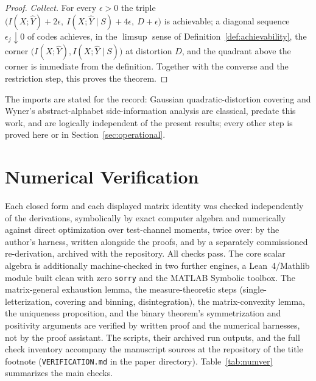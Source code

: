﻿\documentclass[11pt,onecolumn]{IEEEtran}
\newcommand{\hY}{\widehat{Y}}
\begin{document}
\begin{proof}
\emph{Collect.} For every $\epsilon>0$ the triple
$\bigl(I(X;\hY)+2\epsilon,\ I(X;\hY\mid S)+4\epsilon,\
D+\epsilon\bigr)$ is achievable; a diagonal sequence
$\epsilon_j\downarrow0$ of codes achieves, in the $\limsup$ sense of
Definition~\ref{def:achievability}, the corner
$\bigl(I(X;\hY),I(X;\hY\mid S)\bigr)$ at distortion $D$, and the
quadrant above the corner is immediate from the definition. Together
with the converse and the restriction step, this proves the theorem.
\end{proof}

The imports are stated for the record: Gaussian quadratic-distortion
covering \cite{berger1971} and Wyner's abstract-alphabet
side-information analysis \cite{wyner1978} are classical, predate this
work, and are logically independent of the present results; every other
step is proved here or in Section~\ref{sec:operational}.

\section{Numerical Verification}
\label{app:numver}

Each closed form and each displayed matrix identity was checked
independently of the derivations, symbolically by exact computer algebra
and numerically against direct optimization over test-channel moments,
twice over: by the author's harness, written alongside the proofs, and
by a separately commissioned re-derivation, archived with the
repository. All checks pass. The core scalar algebra is
additionally machine-checked in two further engines, a Lean~4/Mathlib
module built clean with zero \texttt{sorry} and the MATLAB Symbolic
toolbox. The matrix-general exhaustion lemma, the measure-theoretic
steps (single-letterization, covering and binning, disintegration), the
matrix-convexity lemma, the uniqueness proposition, and the binary
theorem's symmetrization and positivity arguments are verified by
written proof and the numerical harnesses, not by the proof assistant.
The scripts, their archived run outputs, and the full check inventory
accompany the manuscript sources at the repository of the title
footnote (\texttt{VERIFICATION.md} in the paper directory).
Table~\ref{tab:numver} summarizes the main checks.
\end{document}

